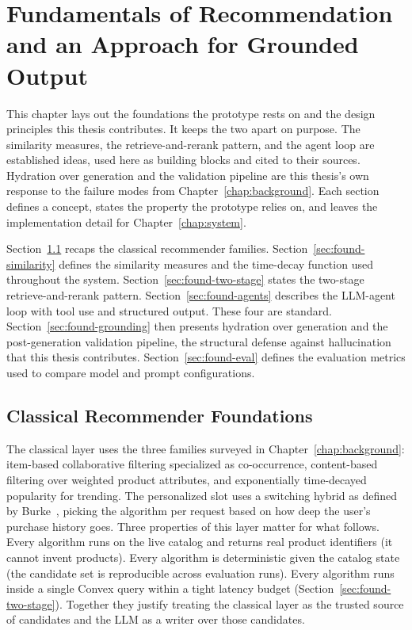 \chapter{Fundamentals of Recommendation and an Approach for
Grounded Output}
\label{chap:foundations}

This chapter lays out the foundations the prototype rests on and
the design principles this thesis contributes. It keeps the two
apart on purpose. The similarity measures, the
retrieve-and-rerank pattern, and the agent loop are established
ideas, used here as building blocks and cited to their sources.
Hydration over generation and the validation pipeline are this
thesis's own response to the failure modes from
Chapter~\ref{chap:background}. Each section defines a concept,
states the property the prototype relies on, and leaves the
implementation detail for Chapter~\ref{chap:system}.

Section~\ref{sec:found-classical} recaps the classical
recommender families. Section~\ref{sec:found-similarity} defines
the similarity measures and the time-decay function used
throughout the system. Section~\ref{sec:found-two-stage} states
the two-stage retrieve-and-rerank pattern.
Section~\ref{sec:found-agents} describes the LLM-agent loop with
tool use and structured output. These four are standard.
Section~\ref{sec:found-grounding} then presents hydration over
generation and the post-generation validation pipeline, the
structural defense against hallucination that this thesis
contributes. Section~\ref{sec:found-eval} defines the evaluation
metrics used to compare model and prompt configurations.

\section{Classical Recommender Foundations}
\label{sec:found-classical}

The classical layer uses the three families surveyed in
Chapter~\ref{chap:background}: item-based collaborative filtering
specialized as co-occurrence, content-based filtering over
weighted product attributes, and exponentially time-decayed
popularity for trending. The personalized slot uses a switching
hybrid as defined by Burke~\cite{Burke2002Hybrid}, picking the
algorithm per request based on how deep the user's purchase
history goes. Three properties of this layer matter for what
follows. Every algorithm runs on the live catalog and returns
real product identifiers (it cannot invent products). Every
algorithm is deterministic given the catalog state (the candidate
set is reproducible across evaluation runs). Every algorithm
runs inside a single Convex query within a tight latency budget
(Section~\ref{sec:found-two-stage}). Together they justify
treating the classical layer as the trusted source of candidates
and the LLM as a writer over those candidates.

